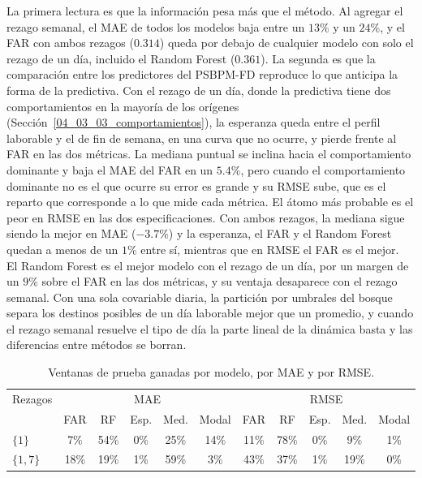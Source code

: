 La primera lectura es que la información pesa más que el método. Al agregar el rezago semanal, el MAE de todos los modelos baja entre un $13\%$ y un $24\%$, y el FAR con ambos rezagos ($0.314$) queda por debajo de cualquier modelo con solo el rezago de un día, incluido el Random Forest ($0.361$). La segunda es que la comparación entre los predictores del PSBPM-FD reproduce lo que anticipa la forma de la predictiva. Con el rezago de un día, donde la predictiva tiene dos comportamientos en la mayoría de los orígenes (Sección~\ref{04_03_03_comportamientos}), la esperanza queda entre el perfil laborable y el de fin de semana, en una curva que no ocurre, y pierde frente al FAR en las dos métricas. La mediana puntual se inclina hacia el comportamiento dominante y baja el MAE del FAR en un $5.4\%$, pero cuando el comportamiento dominante no es el que ocurre su error es grande y su RMSE sube, que es el reparto que corresponde a lo que mide cada métrica. El átomo más probable es el peor en RMSE en las dos especificaciones. Con ambos rezagos, la mediana sigue siendo la mejor en MAE ($-3.7\%$) y la esperanza, el FAR y el Random Forest quedan a menos de un $1\%$ entre sí, mientras que en RMSE el FAR es el mejor.\\

El Random Forest es el mejor modelo con el rezago de un día, por un margen de un $9\%$ sobre el FAR en las dos métricas, y su ventaja desaparece con el rezago semanal. Con una sola covariable diaria, la partición por umbrales del bosque separa los destinos posibles de un día laborable mejor que un promedio, y cuando el rezago semanal resuelve el tipo de día la parte lineal de la dinámica basta y las diferencias entre métodos se borran.

\begin{table}[H]
\centering\small
\setlength{\tabcolsep}{3.5pt}
\caption{Ventanas de prueba ganadas por modelo, por MAE y por RMSE.}
\label{tab:apl_bloqueA_ventanas}
\begin{tabular}{l ccccc ccccc}
\hline
Rezagos & \multicolumn{5}{c}{MAE} & \multicolumn{5}{c}{RMSE} \\
 & FAR & RF & Esp. & Med. & Modal & FAR & RF & Esp. & Med. & Modal \\
\hline
$\{1\}$ & 7\% & 54\% & 0\% & 25\% & 14\% & 11\% & 78\% & 0\% & 9\% & 1\% \\
$\{1,7\}$ & 18\% & 19\% & 1\% & 59\% & 3\% & 43\% & 37\% & 1\% & 19\% & 0\% \\
\hline
\end{tabular}
\end{table}

